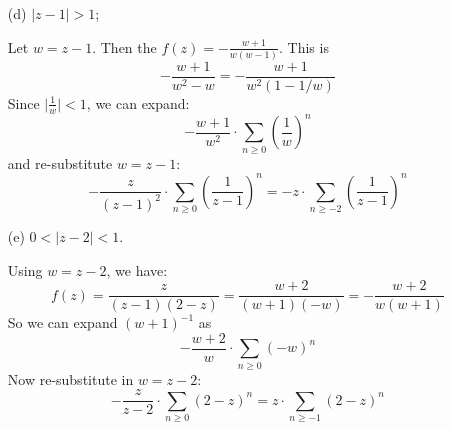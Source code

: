 \documentclass{article}
\begin{document}
\begin{itemize}
        \item [(d)] $\lvert z - 1 \rvert > 1$;
            \begin{answer}
                Let $w = z - 1$. Then the $f(z) = -\frac{w + 1}{w(w - 1)}$. This is 
                    \begin{equation*}
                        -\dfrac{w + 1}{w^{2} - w} = -\dfrac{w + 1}{w^{2}(1 - 1/w)}
                    \end{equation*}
                Since $\lvert \frac{1}{w} \rvert < 1$, we can expand:
                    \begin{equation*}
                        -\dfrac{w + 1}{w^{2}} \cdot \sum_{n \geq 0}\left(\dfrac{1}{w}\right)^{n}
                    \end{equation*}
                and re-substitute $w = z - 1$:
                    \begin{equation*}
                        -\dfrac{z}{(z - 1)^{2}} \cdot \sum_{n \geq 0}\left(\dfrac{1}{z - 1}\right)^{n} = -z \cdot \sum_{n \geq -2} \left(\dfrac{1}{z - 1}\right)^{n}
                    \end{equation*}
            \end{answer}

        \item [(e)] $0 < \lvert z - 2 \rvert < 1$. 
            \begin{answer}
                Using $w = z - 2$, we have:
                    \begin{equation*}
                        f(z) = \dfrac{z}{(z - 1)(2 - z)} = \dfrac{w + 2}{(w + 1)(-w)} = - \dfrac{w + 2}{w(w + 1)}
                    \end{equation*}
                So we can expand $(w + 1)^{-1}$ as 
                    \begin{equation*}
                        -\dfrac{w + 2}{w} \cdot \sum_{n \geq 0}(-w)^{n}
                    \end{equation*}
                Now re-substitute in $w = z - 2$:
                    \begin{equation*}
                        -\dfrac{z}{z - 2} \cdot \sum_{n \geq 0}(2 - z)^{n} = z \cdot \sum_{n \geq -1}(2 - z)^{n}
                    \end{equation*}
            \end{answer}
    \end{itemize}
\end{document}
